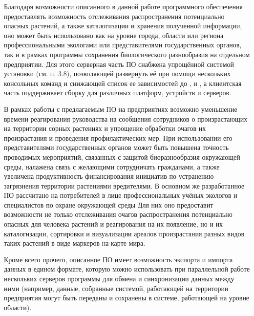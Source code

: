 \nwln
Благодаря возможности описанного в данной работе программного обеспечения предоставлять возможность отслеживания распространения потенциально опасных растений, а также каталогизации и хранения полученной информации, оно может быть использовано как на уровне города, области или региона профессиональными экологами или представителями государственных органов, так и в рамках программы сохранения биологического разнообразия на отдельном предприятии.
Для этого серверная часть ПО снабжена упрощённой системой установки (см. п. 3.8), позволяющей развернуть её при помощи нескольких консольных команд и снижающей список ее зависимостей до ,  и , а клиентская часть поддерживает сборку для различных платформ, устройств и серверов.

\nwln
В рамках работы с предлагаемым ПО на предприятиях возможно уменьшение времени реагирования руководства на сообщения сотрудников о произрастающих на территории сорных растениях и упрощение обработки очагов их произрастания и проведения профилактических мер.
При использовании его представителями государственных органов может быть повышена точность проводимых мероприятий, связанных с защитой биоразнообразия окружающей среды, налажена связь с желающими сотрудничать гражданами, а также увеличена продуктивность финансирования инициатив по устранению загрязнения территории растениями вредителями.
В основном же разработанное ПО рассчитано на потребителей в лице профессиональных учёных экологов и специалистов по охране окружающей среды
Для них оно предоставит возможности не только отслеживания очагов распространения потенциально опасных для человека растений и реагирования на их появление, но и их каталогизации, сортировки и визуализации ареалов произрастания разных видов таких растений в виде маркеров на карте мира.

\nwln
Кроме всего прочего, описанное ПО имеет возможность экспорта и импорта данных в едином формате, которую можно использовать при параллельной работе нескольких серверов программы для обмена и синхронизации данных между ними (например, данные, собранные системой, работающей на территории предприятия могут быть переданы и сохранены в системе, работающей на уровне области).
